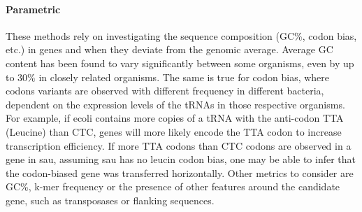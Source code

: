 \paragraph{Parametric}
These methods rely on investigating the sequence composition (GC\%, codon bias, etc.) in genes and when they deviate from the genomic average.
Average GC content has been found to vary significantly between some organisms, even by up to $30\%$ in closely related organisms\citep{ihgt}.
The same is true for codon bias, where codons variants are observed with different frequency in different bacteria, dependent on the expression levels of the tRNAs in those respective organisms\citep{ihgt,codonbias}.
For example, if \ac{ecoli} contains more copies of a tRNA with the anti-codon TTA (Leucine) than CTC, genes will more likely encode the TTA codon to increase transcription efficiency\citep{codonbias}.
If more TTA codons than CTC codons are observed in a gene in \ac{sau}, assuming \ac{sau} has no leucin codon bias, one may be able to infer that the codon-biased gene was transferred horizontally\citep{ihgt}.
Other metrics to consider are GC\%, k-mer frequency or the presence of other features around the candidate gene, such as transposases or flanking sequences\citep{ihgt}.
